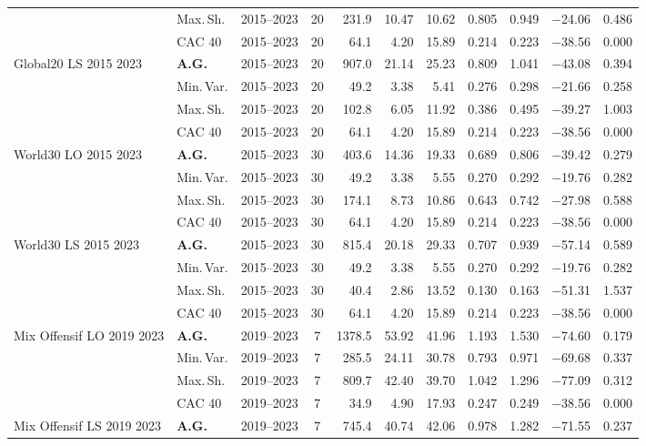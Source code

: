 \begin{longtable}{p{2.6cm} l c c r r r r r r r}
 & Max.\,Sh. & 2015--2023 & 20 & 231.9 & 10.47 & 10.62 & 0.805 & 0.949 & $-$24.06 & 0.486 \\
 & CAC 40 & 2015--2023 & 20 & 64.1 & 4.20 & 15.89 & 0.214 & 0.223 & $-$38.56 & 0.000 \\
\midrule
Global20 LS 2015 2023 & \textbf{A.G.} & 2015--2023 & 20 & 907.0 & 21.14 & 25.23 & 0.809 & 1.041 & $-$43.08 & 0.394 \\
 & Min.\,Var. & 2015--2023 & 20 & 49.2 & 3.38 & 5.41 & 0.276 & 0.298 & $-$21.66 & 0.258 \\
 & Max.\,Sh. & 2015--2023 & 20 & 102.8 & 6.05 & 11.92 & 0.386 & 0.495 & $-$39.27 & 1.003 \\
 & CAC 40 & 2015--2023 & 20 & 64.1 & 4.20 & 15.89 & 0.214 & 0.223 & $-$38.56 & 0.000 \\
\midrule
World30 LO 2015 2023 & \textbf{A.G.} & 2015--2023 & 30 & 403.6 & 14.36 & 19.33 & 0.689 & 0.806 & $-$39.42 & 0.279 \\
 & Min.\,Var. & 2015--2023 & 30 & 49.2 & 3.38 & 5.55 & 0.270 & 0.292 & $-$19.76 & 0.282 \\
 & Max.\,Sh. & 2015--2023 & 30 & 174.1 & 8.73 & 10.86 & 0.643 & 0.742 & $-$27.98 & 0.588 \\
 & CAC 40 & 2015--2023 & 30 & 64.1 & 4.20 & 15.89 & 0.214 & 0.223 & $-$38.56 & 0.000 \\
\midrule
World30 LS 2015 2023 & \textbf{A.G.} & 2015--2023 & 30 & 815.4 & 20.18 & 29.33 & 0.707 & 0.939 & $-$57.14 & 0.589 \\
 & Min.\,Var. & 2015--2023 & 30 & 49.2 & 3.38 & 5.55 & 0.270 & 0.292 & $-$19.76 & 0.282 \\
 & Max.\,Sh. & 2015--2023 & 30 & 40.4 & 2.86 & 13.52 & 0.130 & 0.163 & $-$51.31 & 1.537 \\
 & CAC 40 & 2015--2023 & 30 & 64.1 & 4.20 & 15.89 & 0.214 & 0.223 & $-$38.56 & 0.000 \\
\midrule
Mix Offensif LO 2019 2023 & \textbf{A.G.} & 2019--2023 & 7 & 1378.5 & 53.92 & 41.96 & 1.193 & 1.530 & $-$74.60 & 0.179 \\
 & Min.\,Var. & 2019--2023 & 7 & 285.5 & 24.11 & 30.78 & 0.793 & 0.971 & $-$69.68 & 0.337 \\
 & Max.\,Sh. & 2019--2023 & 7 & 809.7 & 42.40 & 39.70 & 1.042 & 1.296 & $-$77.09 & 0.312 \\
 & CAC 40 & 2019--2023 & 7 & 34.9 & 4.90 & 17.93 & 0.247 & 0.249 & $-$38.56 & 0.000 \\
\midrule
Mix Offensif LS 2019 2023 & \textbf{A.G.} & 2019--2023 & 7 & 745.4 & 40.74 & 42.06 & 0.978 & 1.282 & $-$71.55 & 0.237 \\

\end{longtable}
